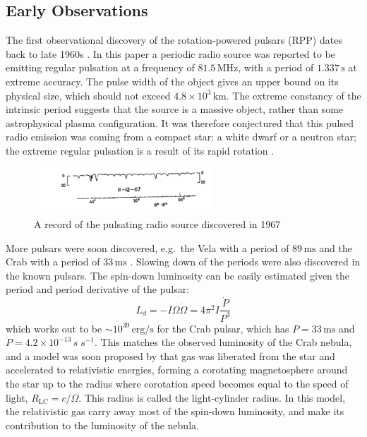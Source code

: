 \subsection{Early Observations}

The first observational discovery of the rotation-powered pulsars (RPP) dates
back to late 1960s \citep{hewish_observation_1968}. In this paper a periodic
radio source was reported to be emitting regular pulsation at a frequency of
$81.5\,\mathrm{MHz}$, with a period of $1.337\,\mathrm{s}$ at extreme accuracy.
The pulse width of the object gives an upper bound on its physical size, which
should not exceed $4.8\times 10^3\,\mathrm{km}$. The extreme constancy of the
intrinsic period suggests that the source is a massive object, rather than some
astrophysical plasma configuration. It was therefore conjectured that this
pulsed radio emission was coming from a compact star: a white dwarf or a neutron
star; the extreme regular pulsation is a result of its rapid rotation
\citep{gold_rotating_1968}.

\begin{figure}[h]
  \centering
  \includegraphics[width=0.6\textwidth]{pics/intro/pulses.png}
  \caption{A record of the pulsating radio source discovered in 1967
    \citep{hewish_observation_1968}}
  \label{fig:pulse}
\end{figure}

More pulsars were soon discovered, e.g.\ the Vela with a period of
$89\,\mathrm{ms}$ \citep{large_pulsar_1968} and the Crab with a period of
$33\,\mathrm{ms}$ \citep{lovelace_pulsar_1968}. Slowing down of the periods were
also discovered in the known pulsars. The spin-down luminosity can be easily
estimated given the period and period derivative of the pulsar:
\begin{equation}
  \label{eq:spindown-power}
  L_{d} = -I\Omega\dot{\Omega} = 4\pi^2 I\frac{\dot{P}}{P^3}
\end{equation}
which works out to be $\sim 10^{39}\,\mathrm{erg/s}$ for the Crab pulsar, which
has $P = 33\,\mathrm{ms}$ and $\dot{P} = 4.2\times 10^{-13}\,{s\;s^{-1}}$. This
matches the observed luminosity of the Crab nebula, and a model was soon
proposed by \citet{gold_rotating_1969} that gas was liberated from the star and
accelerated to relativistic energies, forming a corotating magnetosphere around
the star up to the radius where corotation speed becomes equal to the speed of
light, $R_\mathrm{LC} = c/\Omega$. This radius is called the light-cylinder
radius. In this model, the relativistic gas carry away most of the spin-down
luminosity, and make its contribution to the luminosity of the nebula.


